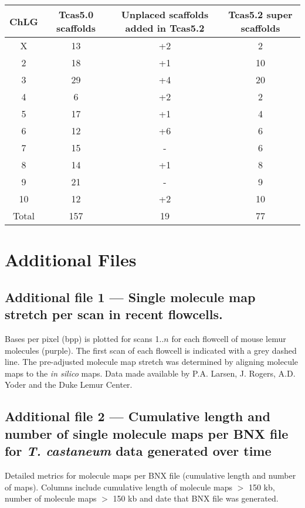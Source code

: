 \documentclass{bmcart}
\begin{document}
\begin{backmatter}
\begin{table}[h!]
	\begin{tabular}{cccc}
		\hline
		ChLG & Tcas5.0 scaffolds & Unplaced scaffolds added in Tcas5.2 & Tcas5.2 super scaffolds \\ \hline
		X & 13 & +2 & 2\\
		2 & 18 & +1 & 10\\
		3 & 29 & +4 & 20\\
		4 & 6 & +2 & 2\\
		5 & 17 & +1 & 4\\
		6 & 12 & +6 & 6\\
		7 & 15 & - & 6\\
		8 & 14 & +1 & 8\\
		9 & 21 & - & 9\\
		10 & 12 & +2 & 10\\ \hline
		Total & 157 & 19 & 77\\ \hline
	\end{tabular}
\end{table}




\section*{Additional Files}

\subsection*{Additional file 1 --- Single molecule map stretch per scan in recent flowcells.} Bases per pixel (bpp) is plotted for scans 1..$n$ for each flowcell of mouse lemur molecules (purple). The first scan of each flowcell is indicated with a grey dashed line. The pre-adjusted molecule map stretch was determined by aligning molecule maps to the \textit{in silico} maps. Data made available by P.A. Larsen, J. Rogers, A.D. Yoder and the Duke Lemur Center.

\subsection*{Additional file 2 --- Cumulative length and number of single molecule maps per BNX file for \textit{T. castaneum} data generated over time}
    Detailed metrics for molecule maps per BNX file (cumulative length and number of maps). Columns include cumulative length of molecule maps  $>$ 150 kb, number of molecule maps $>$ 150 kb and date that BNX file was generated.


\end{backmatter}
\end{document}
